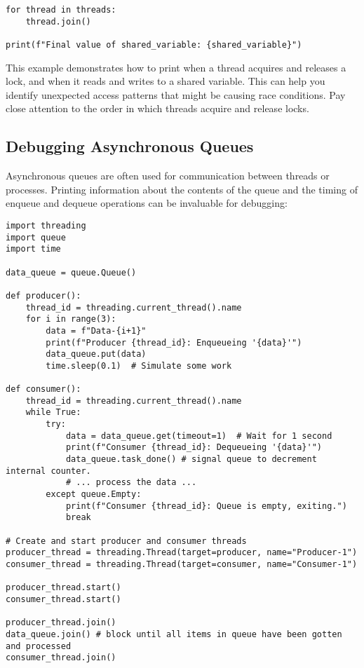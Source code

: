 \documentclass{article}
\begin{document}
{{{\begin{verbatim}
for thread in threads:
    thread.join()

print(f"Final value of shared_variable: {shared_variable}")
\end{verbatim}

This example demonstrates how to print when a thread acquires and releases a lock, and when it reads and writes to a shared variable. This can help you identify unexpected access patterns that might be causing race conditions.  Pay close attention to the order in which threads acquire and release locks.

\subsection*{Debugging Asynchronous Queues}

Asynchronous queues are often used for communication between threads or processes. Printing information about the contents of the queue and the timing of enqueue and dequeue operations can be invaluable for debugging:

\begin{verbatim}
import threading
import queue
import time

data_queue = queue.Queue()

def producer():
    thread_id = threading.current_thread().name
    for i in range(3):
        data = f"Data-{i+1}"
        print(f"Producer {thread_id}: Enqueueing '{data}'")
        data_queue.put(data)
        time.sleep(0.1)  # Simulate some work

def consumer():
    thread_id = threading.current_thread().name
    while True:
        try:
            data = data_queue.get(timeout=1)  # Wait for 1 second
            print(f"Consumer {thread_id}: Dequeueing '{data}'")
            data_queue.task_done() # signal queue to decrement internal counter.
            # ... process the data ...
        except queue.Empty:
            print(f"Consumer {thread_id}: Queue is empty, exiting.")
            break

# Create and start producer and consumer threads
producer_thread = threading.Thread(target=producer, name="Producer-1")
consumer_thread = threading.Thread(target=consumer, name="Consumer-1")

producer_thread.start()
consumer_thread.start()

producer_thread.join()
data_queue.join() # block until all items in queue have been gotten and processed
consumer_thread.join()
\end{verbatim}

}}}
\end{document}
